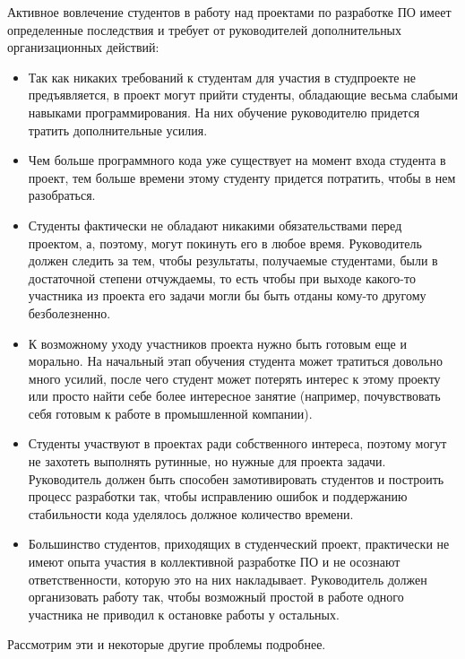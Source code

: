 \documentclass[a4paper]{article}
\begin{document}
Активное вовлечение студентов в работу над проектами по разработке ПО имеет определенные последствия и требует от руководителей дополнительных организационных действий:
\begin{itemize}
 \item Так как никаких требований к студентам для участия в студпроекте не предъявляется, в проект могут прийти студенты, обладающие весьма слабыми навыками программирования. На них обучение руководителю придется тратить дополнительные усилия. 
 \item Чем больше программного кода уже существует на момент входа студента в проект, тем больше времени этому студенту придется потратить, чтобы в нем разобраться.
 \item Студенты фактически не обладают никакими обязательствами перед проектом, а, поэтому, могут покинуть его в любое время. Руководитель должен следить за тем, чтобы результаты, получаемые студентами, были в достаточной степени отчуждаемы, то есть чтобы при выходе какого-то участника из проекта его задачи могли бы быть отданы кому-то другому безболезненно.
 \item К возможному уходу участников проекта нужно быть готовым еще и морально. На начальный этап обучения студента может тратиться довольно много усилий, после чего студент может потерять интерес к этому проекту или просто найти себе более интересное занятие (например, почувствовать себя готовым к работе в промышленной компании). 
 \item Студенты участвуют в проектах ради собственного интереса, поэтому могут не захотеть выполнять рутинные, но нужные для проекта задачи. Руководитель должен быть способен замотивировать студентов и построить процесс разработки так, чтобы исправлению ошибок и поддержанию стабильности кода уделялось должное количество времени. 
 \item Большинство студентов, приходящих в студенческий проект, практически не имеют опыта участия в коллективной разработке ПО и не осознают ответственности, которую это на них накладывает. Руководитель должен организовать работу так, чтобы возможный простой в работе одного участника не приводил к остановке работы у остальных. 
\end{itemize}
Рассмотрим эти и некоторые другие проблемы подробнее.
\end{document}
